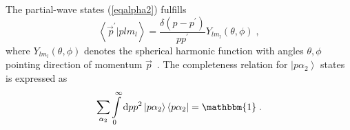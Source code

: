 The partial-wave states (\ref{eqalpha2}) fulfills
\begin{equation}
\left<\!\vec{\, p}^{\prime}|plm_{l}\right> = \frac{\delta (p - p^{\prime})}{pp^{\prime}}Y_{lm_{l}}(\theta,\phi)\;,
\end{equation}
where $Y_{lm_{l}}(\theta,\phi)$ denotes the spherical harmonic function with angles $\theta, \phi$ pointing direction of momentum $\vec{p}$~\cite{edmonds}. The completeness relation for $\left|p \alpha_{2}\right>$ states is expressed as
\begin{equation}
\sum\limits_{\alpha_{2}}\int\limits_{0}^{\infty}\mathrm{d}p p^{2}\ket{p\alpha_{2}}\bra{p\alpha_{2}} = \mathbbm{1}\;.
\end{equation}

